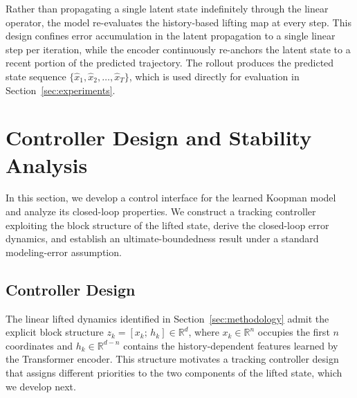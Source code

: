 \documentclass[journal]{IEEEtran}
\begin{document}
Rather than propagating a single latent state indefinitely through the linear operator, the model re-evaluates the history-based lifting map at every step. This design confines error accumulation in the latent propagation to a single linear step per iteration, while the encoder continuously re-anchors the latent state to a recent portion of the predicted trajectory. The rollout produces the predicted state sequence $\{\hat{x}_1,\hat{x}_2,\ldots,\hat{x}_T\}$, which is used directly for evaluation in Section~\ref{sec:experiments}.

\section{Controller Design and Stability Analysis}
\label{sec:control}

In this section, we develop a control interface for the learned Koopman model and analyze its closed-loop properties. We construct a tracking controller exploiting the block structure of the lifted state, derive the closed-loop error dynamics, and establish an ultimate-boundedness result under a standard modeling-error assumption.

\subsection{Controller Design}
\label{subsec:controller_design}

The linear lifted dynamics identified in Section~\ref{sec:methodology} admit the explicit block structure $z_k = [x_k;\, h_k] \in \mathbb{R}^d$, where $x_k \in \mathbb{R}^n$ occupies the first $n$ coordinates and $h_k \in \mathbb{R}^{d-n}$ contains the history-dependent features learned by the Transformer encoder. This structure motivates a tracking controller design that assigns different priorities to the two components of the lifted state, which we develop next.
\end{document}
